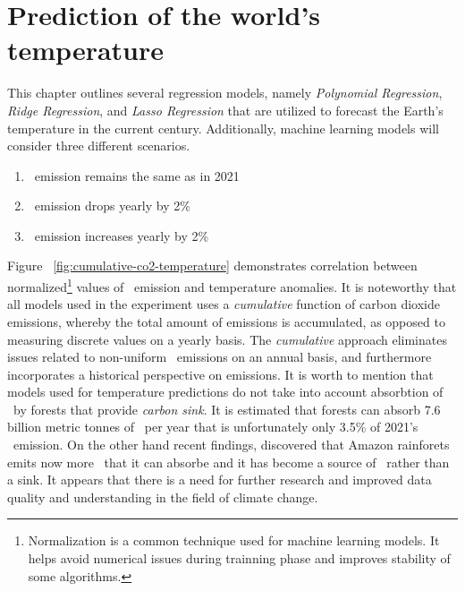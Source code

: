 \chapter{Prediction of the world's temperature}
\label{chap:two}

This chapter outlines several regression models, namely \textit{Polynomial Regression}, \textit{Ridge Regression}, and \textit{Lasso Regression} that are utilized to forecast the Earth's temperature in the current century. Additionally, machine learning models will consider three different scenarios.
\begin{enumerate}
  \item \coo\ emission remains the same as in 2021
  \item \coo\ emission drops yearly by 2\%
  \item \coo\ emission increases yearly by 2\%
\end{enumerate}
Figure ~\ref{fig:cumulative-co2-temperature} demonstrates correlation between normalized\footnote{Normalization is a common technique used for machine learning models. It helps avoid numerical issues during trainning phase and improves stability of some algorithms. } values of \coo\ emission and temperature anomalies.
It is noteworthy that all models used in the experiment uses a \textit{cumulative} function of carbon dioxide emissions, whereby the total amount of emissions is accumulated, as opposed to measuring discrete values on a yearly basis. 
The \textit{cumulative} approach eliminates issues related to non-uniform \coo\ emissions on an annual basis, and furthermore incorporates a historical perspective on emissions.
It is worth to mention that models used for temperature predictions do not take into account absorbtion of \coo\ by forests that provide \textit{carbon sink}. It is estimated that forests can absorb 7.6 billion metric tonnes of \coo\ per year\cite{forest-absorbs} that is unfortunately only 3.5\% of 2021's \coo\ emission.
On the other hand recent findings\cite{forest-emits}, discovered that Amazon rainforets emits now more \coo\ that it can absorbe and it has become a source of \coo\, rather than a sink. It appears that there is a need for further research and improved data quality and understanding in the field of climate change. 

